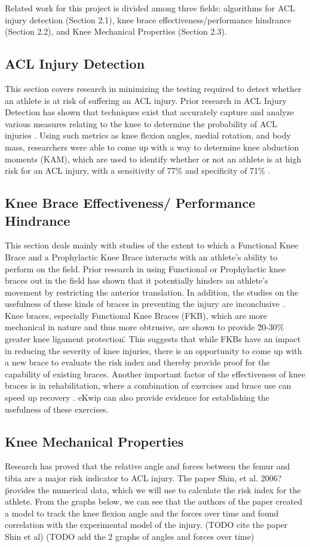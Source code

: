 Related work for this project is divided among three fields: algorithms for ACL injury detection (Section 2.1), knee brace effectiveness/performance hindrance (Section 2.2), and Knee Mechanical Properties (Section 2.3).

\subsection{ACL Injury Detection} This section covers research in minimizing the testing required to detect whether an athlete is at risk of suffering an ACL injury. Prior research in ACL Injury Detection has shown that techniques exist that accurately capture and analyze various measures relating to the knee to determine the probability of ACL injuries \cite{smedicine}. Using such metrics as knee flexion angles, medial rotation, and body mass, researchers were able to come up with a way to determine knee abduction moments (KAM), which are used to identify whether or not an athlete is at high risk for an ACL injury, with a sensitivity of 77\% and specificity of 71\% \cite{smedicine}\cite{Bahr01062005}. 

\subsection{Knee Brace Effectiveness/ Performance Hindrance} This section deals mainly with studies of the extent to which a Functional Knee Brace and a Prophylactic Knee Brace interacts with an athlete's ability to perform on the field. Prior research in using Functional or Prophylactic knee braces out in the field has shown that it potentially hinders an athlete's movement by restricting the anterior translation. In addition, the studies on the usefulness of these kinds of braces in preventing the injury are inconclusive \cite{Myer01042011}. Knee braces, especially Functional Knee Braces (FKB), which are more mechanical in nature and thus more obtrusive, are shown to provide \"20-30\% greater knee ligament protection\". This suggests that while FKBs have an impact in reducing the severity of knee injuries, there is an opportunity to come up with a new brace to evaluate the risk index and thereby provide proof for the capability of existing braces. Another important factor of the effectiveness of knee braces is in rehabilitation, where a combination of exercises and brace use can speed up recovery \cite{hewett2010acl}. eKwip can also provide evidence for establishing the usefulness of these exercises.

\subsection{Knee Mechanical Properties} Research has proved that the relative angle and forces between the femur and tibia are a major risk indicator to ACL injury. The paper \"Shin, et al. 2006?\" provides the numerical data, which we will use to calculate the risk index for the athlete. From the graphs below, we can see that the authors of the paper created a model to track the knee flexion angle and the forces over time and found correlation with the experimental model of the injury. (TODO cite the paper Shin et al)
(TODO add the 2 graphs of angles and forces over time)
